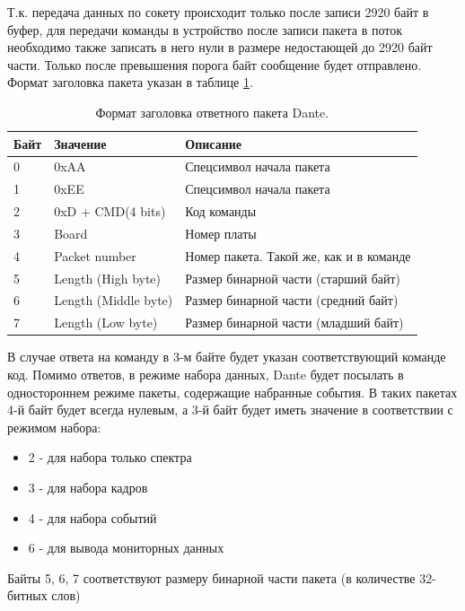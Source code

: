 \documentclass[a4paper,14pt]{extreport}
\begin{document}
Т.к. передача данных по сокету происходит только после записи 2920 байт в буфер, для передачи команды в устройство после записи пакета в поток необходимо также записать в него нули в размере недостающей до 2920 байт части. Только после превышения порога байт сообщение будет отправлено. Формат заголовка пакета указан в таблице \ref{tab:dante-reply-format}.

\begin{table}
    \centering
    \begin{adjustbox}{width=\textwidth}
        \begin{tabular}{|l|l|l|}
        \hline
        Байт & Значение & Описание \\
        \hline
        0 & 0xAA & Спецсимвол начала пакета \\
        \hline
        1 & 0xEE & Спецсимвол начала пакета \\
        \hline
        2 & 0xD + CMD(4 bits) & Код команды \\
        \hline
        3 & Board & Номер платы \\
        \hline
        4 & Packet number & Номер пакета. Такой же, как и в команде \\
        \hline
        5 & Length (High byte) & Размер бинарной части (старший байт) \\
        \hline
        6 & Length (Middle byte) & Размер бинарной части (средний байт) \\
        \hline
        7 & Length (Low byte) & Размер бинарной части (младший байт) \\
        \hline
        \end{tabular}
    \end{adjustbox}
    \caption{Формат заголовка ответного пакета Dante.}
    \label{tab:dante-reply-format}
\end{table}

В случае ответа на команду в 3-м байте будет указан соответствующий команде код. Помимо ответов, в режиме набора данных, Dante будет посылать в одностороннем режиме пакеты, содержащие набранные события. В таких пакетах 4-й байт будет всегда нулевым, а 3-й байт будет иметь значение в соответствии с режимом набора:

\begin{itemize}
    \item 2 - для набора только спектра
    \item 3 - для набора кадров
    \item 4 - для набора событий
    \item 6 - для вывода мониторных данных
\end{itemize}
Байты 5, 6, 7 соответствуют размеру бинарной части пакета (в количестве 32-битных слов)
\end{document}
